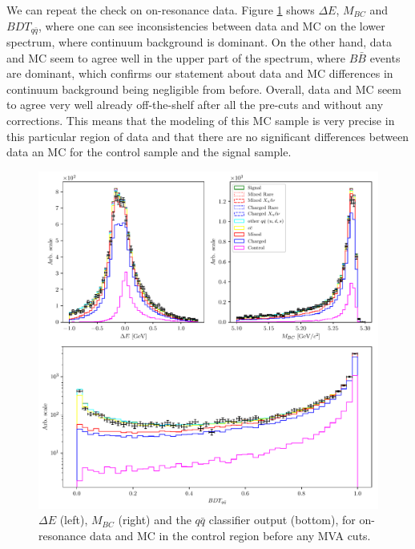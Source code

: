 \documentclass[  headings=standardclasses,
  headings=big,oneside,a4paper,openany,12pt]{scrbook}
\begin{document}

We can repeat the check on on-resonance data. Figure \ref{fig:onres_control} shows $\Delta E$, $M_{BC}$ and $BDT_{q \bar q}$, where one can see inconsistencies between data and MC on the lower spectrum, where continuum background is dominant. On the other hand, data and MC seem to agree well in the upper part of the spectrum, where $B \bar B$ events are dominant, which confirms our statement about data and MC differences in continuum background being negligible from before. Overall, data and MC seem to agree very well already off-the-shelf after all the pre-cuts and without any corrections. This means that the modeling of this MC sample is very precise in this particular region of data and that there are no significant differences between data an MC for the control sample and the signal sample.

\begin{figure}[H]
\centering
\captionsetup{width=0.8\linewidth}
\includegraphics[width=\linewidth]{fig/onres_control}
\caption{$\Delta E$ (left), $M_{BC}$ (right) and the $q \bar q$ classifier output (bottom), for on-resonance data and MC in the control region before any MVA cuts.}
\label{fig:onres_control}
\end{figure}
\end{document}
